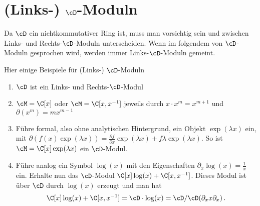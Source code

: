 \section{(Links-) $\cD$-Moduln}
Da $\cD$ ein nichtkommutativer Ring ist, muss man vorsichtig sein und zwischen
Links- und Rechts-$\cD$-Moduln unterscheiden.
Wenn im folgendem von $\cD$-Moduln gesprochen wird, werden immer
Links-$\cD$-Moduln gemeint.

\begin{exmp}
Hier einige Beispiele für (Links-) $\cD$-Moduln
\begin{enumerate}
%
\item $\cD$ ist ein Links- und Rechts-$\cD$-Modul
%
\item $\cM=\C[x]$ oder $\cM=\C[x,x^{-1}]$ jeweils durch $x\cdot x^{m}=x^{m+1}$
und $\partial(x^m)=mx^{m-1}$
%
\item Führe formal, also ohne analytischen Hintergrund, ein Objekt
$\exp(\lambda x)$ ein, mit $\partial(f(x)\exp(\lambda x))=\frac{\partial
f}{\partial x}\exp(\lambda x)+f\lambda\exp(\lambda x)$.  So ist
$\cM=\C[x]\exp(\lambda x)$ ein $\cD$-Modul.
%
\begin{comment}
\cite[Exmp 2.2]{ArkhipovDmod}
\end{comment}
\item Führe analog ein Symbol $\log(x)$ mit den Eigenschaften
$\partial_x\log(x)=\frac{1}{x}$ ein. Erhalte nun das $\cD$-Modul
$\C[x]\log(x)+\C[x,x^{-1}]$. Dieses Modul ist über $\cD$ durch $\log(x)$
erzeugt und man hat
\[
\C[x]\log(x)+\C[x,x^{-1}]=\cD\cdot\log(x)=\cD\slash\cD(\partial_x x\partial_x) \,.
\]
%
\begin{comment}
\cite[Exmp 3.1.4]{ginzburg}
\end{comment}
\end{enumerate}
\end{exmp}

\begin{comment}
\begin{lem}\cite[Lem 2.3.3.]{sabbah_cimpa90}
Sei $\cM$ ein Links-$\cD$-Modul von endlichem Typ, welches auch von endlichem
Typ über $\Ckx$ ist. Dann ist $\cM$ bereits ein freies $\C\{x\}$-Modul.
\end{lem}
\begin{proof}
Siehe \cite[Lem 2.3.3.]{sabbah_cimpa90}.
\end{proof}
\begin{cor} \cite[Cor 2.3.4.]{sabbah_cimpa90}
Falls $\cM$ ein Links-$\cD$-Modul von endlichem Typ, welches außerdem ein
endlich dimensionaler Vektorraum ist, so ist schon $\cM=\{0\}$.
\end{cor}
\end{comment}

